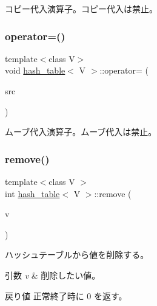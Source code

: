 コピー代入演算子。コピー代入は禁止。 \hypertarget{classhash__table_a770e1e703ae71c41f18ff727882ae4ed}{}\label{classhash__table_a770e1e703ae71c41f18ff727882ae4ed} 
\subsubsection{\texorpdfstring{operator=()}{operator=()}\hspace{0.1cm}{\footnotesize\ttfamily [2/2]}}
{\footnotesize\ttfamily template$<$class V$>$ \\
void \hyperlink{classhash__table}{hash\+\_\+table}$<$ V $>$\+::operator= (\begin{DoxyParamCaption}\item[{const \hyperlink{classhash__table}{hash\+\_\+table}$<$ V $>$ \&\&}]{src }\end{DoxyParamCaption})\hspace{0.3cm}{\ttfamily [delete]}}

ムーブ代入演算子。ムーブ代入は禁止。 \hypertarget{classhash__table_a8ac0d9136be9250f7059d07099a4393e}{}\label{classhash__table_a8ac0d9136be9250f7059d07099a4393e} 
\subsubsection{\texorpdfstring{remove()}{remove()}}
{\footnotesize\ttfamily template$<$class V $>$ \\
int \hyperlink{classhash__table}{hash\+\_\+table}$<$ V $>$\+::remove (\begin{DoxyParamCaption}\item[{const V \&}]{v }\end{DoxyParamCaption})}

ハッシュテーブルから値を削除する。 
\begin{DoxyParams}{引数}
{\em v} & 削除したい値。 \\
\hline
\end{DoxyParams}
\begin{DoxyReturn}{戻り値}
正常終了時に 0 を返す。 
\end{DoxyReturn}
\hypertarget{classhash__table_ace4fefe428377b31e479f516aad83e72}{}\label{classhash__table_ace4fefe428377b31e479f516aad83e72} 
